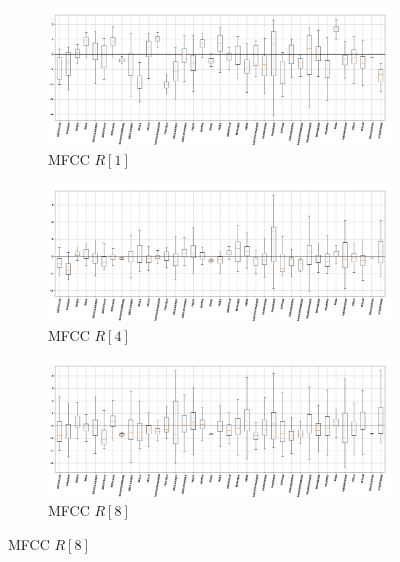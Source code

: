 \documentclass[12pt,letterpaper]{article}
\begin{document}
\begin{figure}[H]
\begin{center}

\begin{subfigure}{1.0\textwidth}
	\centering
	\includegraphics[width=\textwidth , height=0.2\textheight]
		{../FiguresFeatures/MFCC_1}
	\caption{MFCC $R[1]$}
	\end{subfigure}
	
	\begin{subfigure}{1.0\textwidth}
	\centering
	\includegraphics[width=\textwidth , height=0.2\textheight]
		{../FiguresFeatures/MFCC_4}
	\caption{MFCC $R[4]$}
	\end{subfigure}
	
	\begin{subfigure}{1.0\textwidth}
	\centering
	\includegraphics[width=\textwidth , height=0.2\textheight]
		{../FiguresFeatures/MFCC_8}
	\caption{MFCC $R[8]$}
	\end{subfigure}
	

\end{center}
\end{figure}
\end{document}
